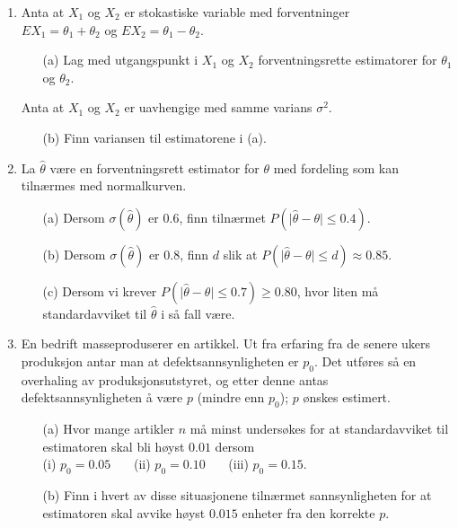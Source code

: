 \begin{enumerate}
\item Anta at $X_1$ og $X_2$ er stokastiske variable med forventninger\\
$EX_1=\theta_1 + \theta_2$ og $EX_2=\theta_1 - \theta_2$.
\begin{itemize}
\item[(a)] Lag med utgangspunkt i $X_1$ og $X_2$ forventningsrette
     estimatorer for $\theta_1$ og $\theta_2$.
\end{itemize}
Anta at $X_1$ og $X_2$ er uavhengige med samme varians $\sigma^2$.
\begin{itemize}
\item[(b)] Finn variansen til estimatorene i (a).
\end{itemize}

\item La $\hat{\theta}$ være en forventningsrett estimator for $\theta$
med fordeling som kan tilnærmes med normalkurven.
\begin{itemize}
\item[(a)] Dersom $\sigma (\hat{\theta})$ er $0.6$, finn tilnærmet
$P(\mid \hat{\theta} - {\theta} \mid \leq 0.4)$.
\item[(b)] Dersom $\sigma (\hat{\theta})$ er $0.8$, finn $d$ slik at
$P(\mid \hat{\theta} - \theta \mid \leq d) \approx 0.85$.
\item[(c)] Dersom vi krever $P(\mid \hat{\theta} - \theta \mid \leq
0.7)\geq 0.80$, hvor liten må standardavviket til
$\hat{\theta}$ i så fall være.
\end{itemize}

\item En bedrift masseproduserer en artikkel. Ut fra erfaring fra
de senere ukers produksjon antar man at
defektsannsynligheten er $p_0$. Det utføres så en overhaling
av produksjonsutstyret, og etter denne antas
defektsannsynligheten å være $p$ (mindre enn $p_0$); $p$
ønskes estimert.
\begin{itemize}
\item[(a)] Hvor mange artikler $n$ må minst undersøkes for at
    standardavviket til estimatoren skal bli høyst $0.01$ dersom\\
(i) $p_0=0.05$ \ \ \    (ii) $p_0=0.10$ \ \ \    (iii) $p_0=0.15$.
\item[(b)] Finn i hvert av disse situasjonene tilnærmet
       sannsynligheten for at estimatoren skal avvike høyst
        $0.015$ enheter fra den korrekte $p$.
\end{itemize}


\end{enumerate}

